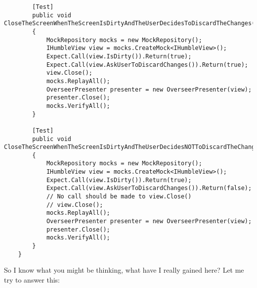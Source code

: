 \documentclass{article}
\begin{document}
{\begin{lstlisting}
        [Test]
        public void CloseTheScreenWhenTheScreenIsDirtyAndTheUserDecidesToDiscardTheChanges()
        {
            MockRepository mocks = new MockRepository();
            IHumbleView view = mocks.CreateMock<IHumbleView>();
            Expect.Call(view.IsDirty()).Return(true);
            Expect.Call(view.AskUserToDiscardChanges()).Return(true);
            view.Close();
            mocks.ReplayAll();
            OverseerPresenter presenter = new OverseerPresenter(view);
            presenter.Close();
            mocks.VerifyAll();
        }

        [Test]
        public void CloseTheScreenWhenTheScreenIsDirtyAndTheUserDecidesNOTToDiscardTheChanges()
        {
            MockRepository mocks = new MockRepository();
            IHumbleView view = mocks.CreateMock<IHumbleView>();
            Expect.Call(view.IsDirty()).Return(true);
            Expect.Call(view.AskUserToDiscardChanges()).Return(false);
            // No call should be made to view.Close()
            // view.Close();
            mocks.ReplayAll();
            OverseerPresenter presenter = new OverseerPresenter(view);
            presenter.Close();
            mocks.VerifyAll();
        }
    }
\end{lstlisting}	

So I know what you might be thinking, what have I really gained here?  Let me try to answer this:

}
\end{document}
